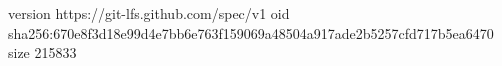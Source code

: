version https://git-lfs.github.com/spec/v1
oid sha256:670e8f3d18e99d4e7bb6e763f159069a48504a917ade2b5257cfd717b5ea6470
size 215833
